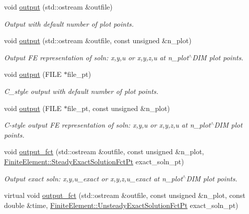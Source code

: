 \begin{DoxyCompactItemize}
void \hyperlink{classoomph_1_1PoissonEquations_a2417afb77d428846d7a1eada342ea8bb}{output} (std\+::ostream \&outfile)
\begin{DoxyCompactList}\small\item\em Output with default number of plot points. \end{DoxyCompactList}\item 
void \hyperlink{classoomph_1_1PoissonEquations_a6683dd0afc16bfddf4e79b6e0e449d43}{output} (std\+::ostream \&outfile, const unsigned \&n\+\_\+plot)
\begin{DoxyCompactList}\small\item\em Output FE representation of soln\+: x,y,u or x,y,z,u at n\+\_\+plot$^\wedge$\+D\+IM plot points. \end{DoxyCompactList}\item 
void \hyperlink{classoomph_1_1PoissonEquations_afeaa8b136b9cc9649635b41bde1b5cda}{output} (F\+I\+LE $\ast$file\+\_\+pt)
\begin{DoxyCompactList}\small\item\em C\+\_\+style output with default number of plot points. \end{DoxyCompactList}\item 
void \hyperlink{classoomph_1_1PoissonEquations_abc30eee5faaa50a65b272012d17ba604}{output} (F\+I\+LE $\ast$file\+\_\+pt, const unsigned \&n\+\_\+plot)
\begin{DoxyCompactList}\small\item\em C-\/style output FE representation of soln\+: x,y,u or x,y,z,u at n\+\_\+plot$^\wedge$\+D\+IM plot points. \end{DoxyCompactList}\item 
void \hyperlink{classoomph_1_1PoissonEquations_ad6c637c8a5221313c2220e8e8c27ec42}{output\+\_\+fct} (std\+::ostream \&outfile, const unsigned \&n\+\_\+plot, \hyperlink{classoomph_1_1FiniteElement_a690fd33af26cc3e84f39bba6d5a85202}{Finite\+Element\+::\+Steady\+Exact\+Solution\+Fct\+Pt} exact\+\_\+soln\+\_\+pt)
\begin{DoxyCompactList}\small\item\em Output exact soln\+: x,y,u\+\_\+exact or x,y,z,u\+\_\+exact at n\+\_\+plot$^\wedge$\+D\+IM plot points. \end{DoxyCompactList}\item 
virtual void \hyperlink{classoomph_1_1PoissonEquations_a6d98964a14b38f4b2e89a2744478f706}{output\+\_\+fct} (std\+::ostream \&outfile, const unsigned \&n\+\_\+plot, const double \&time, \hyperlink{classoomph_1_1FiniteElement_ad4ecf2b61b158a4b4d351a60d23c633e}{Finite\+Element\+::\+Unsteady\+Exact\+Solution\+Fct\+Pt} exact\+\_\+soln\+\_\+pt)

\end{DoxyCompactItemize}
